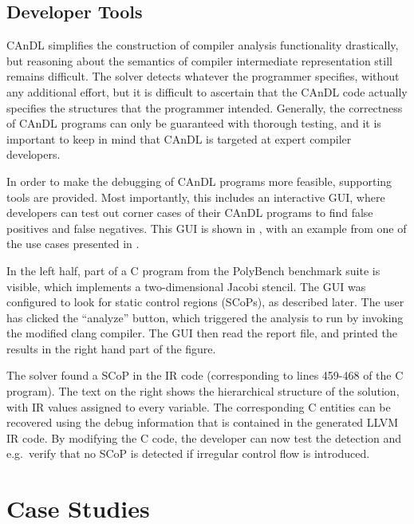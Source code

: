\subsection{Developer Tools}

    CAnDL simplifies the construction of compiler analysis functionality
    drastically, but reasoning about the semantics of compiler intermediate
    representation still remains difficult.
    The solver detects whatever the programmer specifies, without any additional
    effort, but it is difficult to ascertain that the CAnDL code actually
    specifies the structures that the programmer intended.
    Generally, the correctness of CAnDL programs can only be guaranteed with
    thorough testing, and it is important to keep in mind that CAnDL is targeted
    at expert compiler developers.

    In order to make the debugging of CAnDL programs more feasible, 
    supporting tools are provided.
    Most importantly, this includes an interactive GUI, where developers can
    test out corner cases of their CAnDL programs to find false positives and
    false negatives.
    This GUI is shown in , with an example from one of the use
    cases presented in .

    In the left half, part of a C program from the PolyBench benchmark suite
    is visible, which implements a two-dimensional Jacobi stencil.
    The GUI was configured to look for static control regions (SCoPs), as
    described later.
    The user has clicked the ``analyze'' button, which triggered the analysis to
    run by invoking the modified clang compiler.
    The GUI then read the report file, and printed the results in the right
    hand part of the figure.

    The solver found a SCoP in the IR code (corresponding to lines 459-468 of
    the C program).
    The text on the right shows the hierarchical structure of the solution, with
    IR values assigned to every variable.
    The corresponding C entities can be recovered using the debug
    information that is contained in the generated LLVM IR code.
    By modifying the C code, the developer can now test the detection and
    e.g.\ verify that no SCoP is detected if irregular control flow is
    introduced.

\section{Case Studies}
\label{sec:casestudies}

